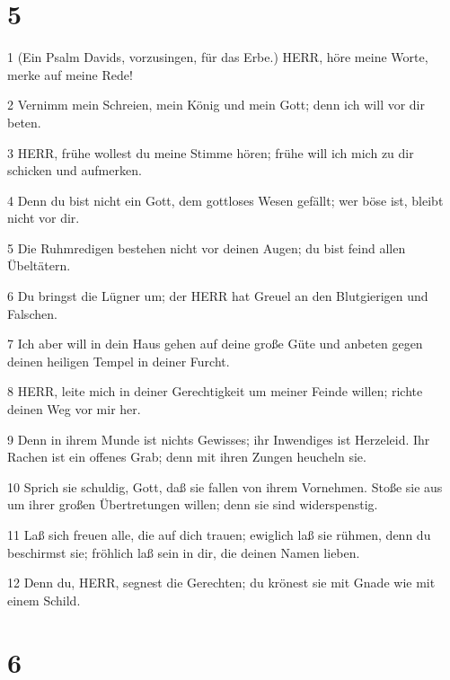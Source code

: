 \chapter{5}

\par 1 (Ein Psalm Davids, vorzusingen, für das Erbe.) HERR, höre meine Worte, merke auf meine Rede!
\par 2 Vernimm mein Schreien, mein König und mein Gott; denn ich will vor dir beten.
\par 3 HERR, frühe wollest du meine Stimme hören; frühe will ich mich zu dir schicken und aufmerken.
\par 4 Denn du bist nicht ein Gott, dem gottloses Wesen gefällt; wer böse ist, bleibt nicht vor dir.
\par 5 Die Ruhmredigen bestehen nicht vor deinen Augen; du bist feind allen Übeltätern.
\par 6 Du bringst die Lügner um; der HERR hat Greuel an den Blutgierigen und Falschen.
\par 7 Ich aber will in dein Haus gehen auf deine große Güte und anbeten gegen deinen heiligen Tempel in deiner Furcht.
\par 8 HERR, leite mich in deiner Gerechtigkeit um meiner Feinde willen; richte deinen Weg vor mir her.
\par 9 Denn in ihrem Munde ist nichts Gewisses; ihr Inwendiges ist Herzeleid. Ihr Rachen ist ein offenes Grab; denn mit ihren Zungen heucheln sie.
\par 10 Sprich sie schuldig, Gott, daß sie fallen von ihrem Vornehmen. Stoße sie aus um ihrer großen Übertretungen willen; denn sie sind widerspenstig.
\par 11 Laß sich freuen alle, die auf dich trauen; ewiglich laß sie rühmen, denn du beschirmst sie; fröhlich laß sein in dir, die deinen Namen lieben.
\par 12 Denn du, HERR, segnest die Gerechten; du krönest sie mit Gnade wie mit einem Schild.

\chapter{6}

